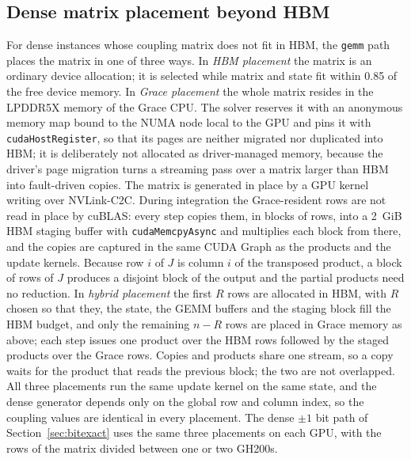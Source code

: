 \documentclass[11pt,a4paper]{article}
\newcommand{\code}[1]{\texttt{#1}}
\begin{document}
\subsection{Dense matrix placement beyond HBM}\label{sec:placement}
For dense instances whose coupling matrix does not fit in HBM, the \code{gemm} path places the matrix in one of three ways. In \emph{HBM placement} the matrix is an ordinary device allocation; it is selected while matrix and state fit within 0.85 of the free device memory. In \emph{Grace placement} the whole matrix resides in the LPDDR5X memory of the Grace CPU. The solver reserves it with an anonymous memory map bound to the NUMA node local to the GPU and pins it with \code{cudaHostRegister}, so that its pages are neither migrated nor duplicated into HBM; it is deliberately not allocated as driver-managed memory, because the driver's page migration turns a streaming pass over a matrix larger than HBM into fault-driven copies. The matrix is generated in place by a GPU kernel writing over NVLink-C2C. During integration the Grace-resident rows are not read in place by cuBLAS: every step copies them, in blocks of rows, into a 2~GiB HBM staging buffer with \code{cudaMemcpyAsync} and multiplies each block from there, and the copies are captured in the same CUDA Graph as the products and the update kernels. Because row $i$ of $J$ is column $i$ of the transposed product, a block of rows of $J$ produces a disjoint block of the output and the partial products need no reduction. In \emph{hybrid placement} the first $R$ rows are allocated in HBM, with $R$ chosen so that they, the state, the GEMM buffers and the staging block fill the HBM budget, and only the remaining $n-R$ rows are placed in Grace memory as above; each step issues one product over the HBM rows followed by the staged products over the Grace rows. Copies and products share one stream, so a copy waits for the product that reads the previous block; the two are not overlapped. All three placements run the same update kernel on the same state, and the dense generator depends only on the global row and column index, so the coupling values are identical in every placement. The dense $\pm1$ bit path of Section~\ref{sec:bitexact} uses the same three placements on each GPU, with the rows of the matrix divided between one or two GH200s.
\end{document}
